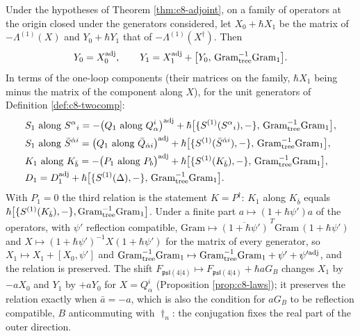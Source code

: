 \begin{corollary}[The test $Q^\dagger=S$ in Gram form]
\label{cor:c8-gram}
Under the hypotheses of Theorem \ref{thm:c8-adjoint}, on a family of operators at the origin closed under the generators considered, let $X_0+\hbar X_1$ be the matrix of $-\Lambda^{(1)}(X)$ and $Y_0+\hbar Y_1$ that of $-\Lambda^{(1)}(X^\dagger)$. Then
\[
Y_0=X_0^{\rm adj},\qquad Y_1=X_1^{\rm adj}+\big[Y_0,\,\mathrm{Gram}_{\rm tree}^{-1}\mathrm{Gram}_{\rm 1}\big].
\]
In terms of the one-loop components (their matrices on the family, $\hbar X_1$ being minus the matrix of the component along $X$), for the unit generators of Definition \ref{def:c8-twocomp}:
\[
\begin{aligned}
&S_1\text{ along }S^\alpha{}_i=-\big(Q_1\text{ along }Q^i_\alpha\big)^{\rm adj}+\hbar\big[\{S^{(1)}(S^\alpha{}_i),-\},\,\mathrm{Gram}_{\rm tree}^{-1}\mathrm{Gram}_{\rm 1}\big],\\
&S_1\text{ along }\bar S^{\dot\alpha i}=\big(Q_1\text{ along }\bar Q_{\dot\alpha i}\big)^{\rm adj}+\hbar\big[\{S^{(1)}(\bar S^{\dot\alpha i}),-\},\,\mathrm{Gram}_{\rm tree}^{-1}\mathrm{Gram}_{\rm 1}\big],\\
&K_1\text{ along }K_{\bar b}=-\big(P_1\text{ along }P_b\big)^{\rm adj}+\hbar\big[\{S^{(1)}(K_{\bar b}),-\},\,\mathrm{Gram}_{\rm tree}^{-1}\mathrm{Gram}_{\rm 1}\big],\\
&D_1=D_1^{\rm adj}+\hbar\big[\{S^{(1)}(\Delta),-\},\,\mathrm{Gram}_{\rm tree}^{-1}\mathrm{Gram}_{\rm 1}\big].
\end{aligned}
\]
With $P_1=0$ the third relation is the statement $K=P^\dagger$: $K_1$ along $K_{\bar b}$ equals $\hbar\big[\{S^{(1)}(K_{\bar b}),-\},\mathrm{Gram}_{\rm tree}^{-1}\mathrm{Gram}_{\rm 1}\big]$. Under a finite part $a\mapsto(1+\hbar\psi')a$ of the operators, with $\psi'$ reflection compatible, $\mathrm{Gram}\mapsto\overline{(1+\hbar\psi')}^{\,T}\mathrm{Gram}\,(1+\hbar\psi')$ and $X\mapsto(1+\hbar\psi')^{-1}X(1+\hbar\psi')$ for the matrix of every generator, so $X_1\mapsto X_1+[X_0,\psi']$ and $\mathrm{Gram}_{\rm tree}^{-1}\mathrm{Gram}_{\rm 1}\mapsto\mathrm{Gram}_{\rm tree}^{-1}\mathrm{Gram}_{\rm 1}+\psi'+\psi'^{\rm adj}$, and the relation is preserved. The shift $F_{\mathfrak{psl}(4|4)}\mapsto F_{\mathfrak{psl}(4|4)}+\hbar aG_B$ changes $X_1$ by $-aX_0$ and $Y_1$ by $+aY_0$ for $X=Q^i_\alpha$ (Proposition \ref{prop:c8-laws}); it preserves the relation exactly when $\bar a=-a$, which is also the condition for $aG_B$ to be reflection compatible, $B$ anticommuting with $\dagger_n$: the conjugation fixes the real part of the outer direction.
\end{corollary}

